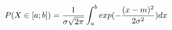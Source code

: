 \documentclass[preview]{standalone}
\begin{document}
\begin{align*}
P( X \in [a;b] ) = { \frac{1}{\sigma \sqrt{2\pi}} } \int_a^b { exp(-{ \frac{ (x - m)^2 }{2 \sigma^2} }) } \space dx
\end{align*}
\end{document}
